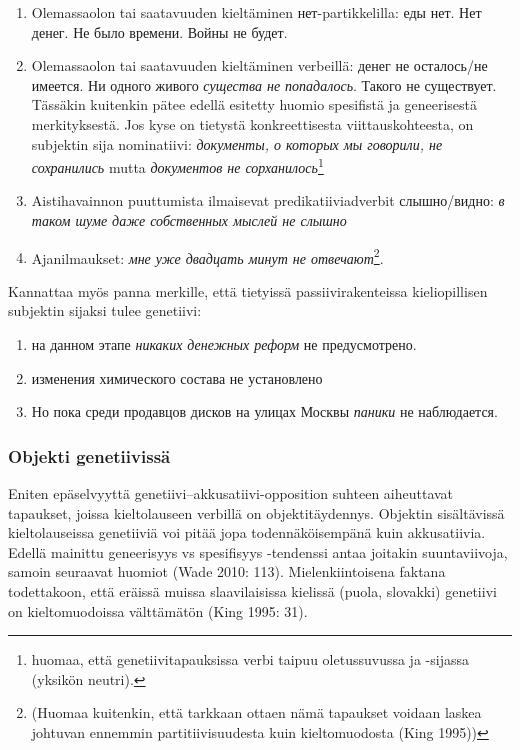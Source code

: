 \documentclass[]{scrartcl}
\providecommand{\tightlist}{%
  \setlength{\itemsep}{0pt}\setlength{\parskip}{0pt}}
\begin{document}
\begin{enumerate}
\def\labelenumi{\arabic{enumi}.}
\tightlist
\item
  Olemassaolon tai saatavuuden kieltäminen нет-partikkelilla: еды нет.
  Нет денег. Не было времени. Войны не будет.
\item
  Olemassaolon tai saatavuuden kieltäminen verbeillä: денег не
  осталось/не имеется. Ни одного живого \emph{существа не попадалось}.
  Такого не существует. Tässäkin kuitenkin pätee edellä esitetty huomio
  spesifistä ja geneerisestä merkityksestä. Jos kyse on tietystä
  konkreettisesta viittauskohteesta, on subjektin sija nominatiivi:
  \emph{документы, о которых мы говорили, не сохранились} mutta
  \emph{документов не сорханилось}\footnote{huomaa, että
    genetiivitapauksissa verbi taipuu oletussuvussa ja -sijassa (yksikön
    neutri).}
\item
  Aistihavainnon puuttumista ilmaisevat predikatiiviadverbit
  слышно/видно: \emph{в таком шуме даже собственных мыслей не слышно}
\item
  Ajanilmaukset: \emph{мне уже двадцать минут не отвечают}\footnote{(Huomaa
    kuitenkin, että tarkkaan ottaen nämä tapaukset voidaan laskea
    johtuvan ennemmin partitiivisuudesta kuin kieltomuodosta (King
    1995))}.
\end{enumerate}

Kannattaa myös panna merkille, että tietyissä passiivirakenteissa
kieliopillisen subjektin sijaksi tulee genetiivi:

\begin{enumerate}
\def\labelenumi{(\arabic{enumi})}
\setcounter{enumi}{59}
\tightlist
\item
  на данном этапе \emph{никаких денежных реформ} не предусмотрено.
\item
  изменения химического состава не установлено
\item
  Но пока среди продавцов дисков на улицах Москвы \emph{паники} не
  наблюдается.
\end{enumerate}

\subsubsection{Objekti genetiivissä}\label{objekti-genetiivissuxe4}

Eniten epäselvyyttä genetiivi--akkusatiivi-opposition suhteen
aiheuttavat tapaukset, joissa kieltolauseen verbillä on
objektitäydennys. Objektin sisältävissä kieltolauseissa genetiiviä voi
pitää jopa todennäköisempänä kuin akkusatiivia. Edellä mainittu
geneerisyys vs spesifisyys -tendenssi antaa joitakin suuntaviivoja,
samoin seuraavat huomiot (Wade 2010: 113). Mielenkiintoisena faktana
todettakoon, että eräissä muissa slaavilaisissa kielissä (puola,
slovakki) genetiivi on kieltomuodoissa välttämätön (King 1995: 31).
\end{document}
